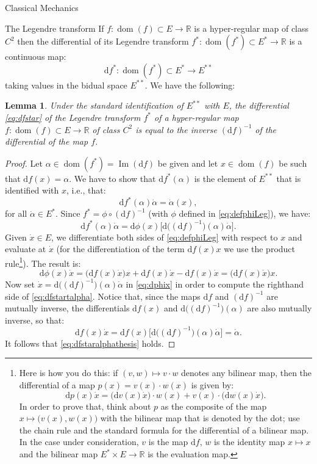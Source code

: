 \documentclass[oneside,a4paper,11pt]{amsbook}
\newcommand{\R}{\mathds R}
\newcommand{\dd}{\mathrm d}
\DeclareMathOperator{\Img}{Im}
\DeclareMathOperator{\Dom}{dom}
\theoremstyle{remark}\newtheorem{exercise}{Exercise}[chapter]
\theoremstyle{plain}\newtheorem{teo}{Theorem}[section]
\theoremstyle{plain}\newtheorem{lem}[teo]{Lemma}
\theoremstyle{plain}\newtheorem{prop}[teo]{Proposition}
\theoremstyle{plain}\newtheorem{cor}[teo]{Corollary}
\theoremstyle{definition}\newtheorem{defin}[teo]{Definition}
\theoremstyle{remark}\newtheorem{rem}[teo]{Remark}
\theoremstyle{definition}\newtheorem{notation}[teo]{Notation}
\theoremstyle{definition}\newtheorem{convention}[teo]{Convention}
\theoremstyle{definition}\newtheorem{example}[teo]{Example}
\numberwithin{section}{chapter}
\numberwithin{equation}{section}
\begin{document}
\begin{chapter}{Classical Mechanics}
\begin{section}{The Legendre transform}
If $f:\Dom(f)\subset E\to\R$ is a hyper-regular map of class $C^2$ then the differential of its Legendre transform
$f^*:\Dom(f^*)\subset E^*\to\R$ is a continuous map:
\begin{equation}\label{eq:dfstar}
\dd f^*:\Dom(f^*)\subset E^*\to E^{**}
\end{equation}
taking values in the bidual space $E^{**}$. We have the following:
\begin{lem}\label{thm:dfdfstar}
Under the standard identification of $E^{**}$ with $E$, the differential \eqref{eq:dfstar} of the Legendre transform
$f^*$ of a hyper-regular map $f:\Dom(f)\subset E\to\R$ of class $C^2$ is equal to the inverse $(\dd f)^{-1}$ of the differential
of the map $f$.
\end{lem}
\begin{proof}
Let $\alpha\in\Dom(f^*)=\Img(\dd f)$ be given and let $x\in\Dom(f)$ be such that $\dd f(x)=\alpha$. We have to show
that $\dd f^*(\alpha)$ is the element of $E^{**}$ that is identified with $x$, i.e., that:
\begin{equation}\label{eq:dfstaralphathesis}
\dd f^*(\alpha)\dot\alpha=\dot\alpha(x),
\end{equation}
for all $\dot\alpha\in E^*$. Since $f^*=\phi\circ(\dd f)^{-1}$ (with $\phi$ defined in \eqref{eq:defphiLeg}), we have:
\begin{equation}\label{eq:dfstartalpha}
\dd f^*(\alpha)\dot\alpha=\dd\phi(x)\big[\dd\big((\dd f)^{-1}\big)(\alpha)\dot\alpha\big].
\end{equation}
Given $\dot x\in E$, we differentiate both sides of \eqref{eq:defphiLeg} with respect to $x$ and evaluate at $\dot x$
(for the differentiation of the term $\dd f(x)x$ we use the product rule\footnote{%
Here is how you do this: if $(v,w)\mapsto v\cdot w$ denotes any bilinear map, then the differential of a map
$p(x)=v(x)\cdot w(x)$ is given by:
\[\dd p(x)\dot x=\big(\dd v(x)\dot x\big)\cdot w(x)+v(x)\cdot\big(\dd w(x)\dot x\big).\]
In order to prove that, think about $p$ as the composite of the map $x\mapsto\big(v(x),w(x)\big)$ with the bilinear
map that is denoted by the dot; use the chain rule and the standard formula for the differential of a bilinear map.
In the case under consideration, $v$ is the map $\dd f$, $w$ is the identity map $x\mapsto x$ and the bilinear map
$E^*\times E\to\R$ is the evaluation map.}). The result is:
\begin{equation}\label{eq:dphix}
\dd\phi(x)\dot x=\big(\dd f(x)\dot x\big)x+\dd f(x)\dot x-\dd f(x)\dot x=\big(\dd f(x)\dot x\big)x.
\end{equation}
Now set $\dot x=\dd\big((\dd f)^{-1}\big)(\alpha)\dot\alpha$ in \eqref{eq:dphix} in order to compute the righthand
side of \eqref{eq:dfstartalpha}. Notice that, since the maps $\dd f$ and $(\dd f)^{-1}$ are mutually inverse,
the differentials $\dd f(x)$ and $\dd\big((\dd f)^{-1}\big)(\alpha)$ are also mutually inverse, so that:
\[\dd f(x)\dot x=\dd f(x)\big[\dd\big((\dd f)^{-1}\big)(\alpha)\dot\alpha\big]=\dot\alpha.\]
It follows that \eqref{eq:dfstaralphathesis} holds.
\end{proof}


\end{section}
\end{chapter}
\end{document}
